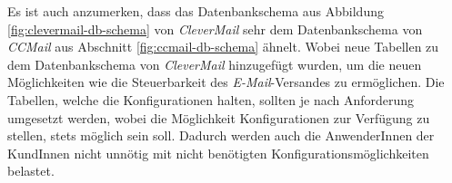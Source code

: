 \newline
\newline
Es ist auch anzumerken, dass das Datenbankschema aus Abbildung \ref{fig:clevermail-db-schema} von \emph{CleverMail} sehr dem Datenbankschema von \emph{CCMail} aus Abschnitt \ref{fig:ccmail-db-schema} ähnelt. Wobei neue Tabellen zu dem Datenbankschema von \emph{CleverMail} hinzugefügt wurden, um die neuen Möglichkeiten wie die Steuerbarkeit des \emph{E-Mail}-Versandes zu ermöglichen. 
\newline
\newline
Die Tabellen, welche die Konfigurationen halten, sollten je nach Anforderung umgesetzt werden, wobei die Möglichkeit Konfigurationen zur Verfügung zu stellen, stets möglich sein soll. Dadurch werden auch die AnwenderInnen der KundInnen nicht unnötig mit nicht benötigten Konfigurationsmöglichkeiten belastet.